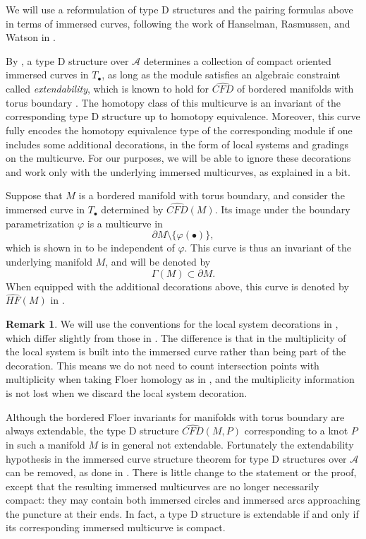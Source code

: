 \documentclass[11pt]{amsart}
\numberwithin{equation}{section}
\numberwithin{theorem}{section}
\theoremstyle{definition}
\newtheorem{remark}[theorem]{Remark}
\renewcommand{\phi}{\varphi}
\newcommand\HFhat{\widehat{\mathit{HF}}}
\newcommand{\CFD}{\widehat{\mathit{CFD}}}
\newcommand{\Alg}{\mathcal{A}}
\begin{document}
We will use a reformulation of type D structures and the pairing formulas above in terms of immersed curves, following the work of Hanselman, Rasmussen, and Watson in \cite{hrw,hrw-properties}. 

By \cite[Theorem 1.5]{hrw}, a type D structure over $\Alg$ determines a collection of compact oriented immersed curves in $T_\bullet$, as long as  the module  satisfies an algebraic constraint called \emph{extendability}, which is known to hold for $\CFD$ of bordered manifolds with torus boundary \cite[Theorem 1.4]{hrw}. The homotopy class of this multicurve is an invariant of the corresponding type D structure up to homotopy equivalence. Moreover, this curve fully encodes the homotopy equivalence type of the corresponding module if one includes some additional decorations, in the form of local systems and gradings on the multicurve. For our purposes, we will be able to ignore these decorations and work only with the underlying immersed multicurves, as explained in a bit.

Suppose that $M$ is a bordered manifold with torus boundary, and consider the immersed curve in $T_\bullet$ determined by $\CFD(M)$. Its image under the boundary parametrization $\phi$ is a multicurve in \[\partial M \setminus \{\phi(\bullet)\},\] which is shown in \cite{hrw} to be independent of $\phi$. This curve is thus an invariant of the underlying manifold $M$, and will be denoted by \[\Gamma(M)\subset \partial M.\]  When equipped with the additional decorations above, this curve is denoted by $\HFhat(M)$ in \cite{hrw}. 

\begin{remark}
We will use the conventions for the local system decorations  in \cite{Hanselman:CFK}, which differ slightly from those in \cite{hrw}. The difference is that in \cite{Hanselman:CFK} the multiplicity of the local system is built into the immersed curve rather than being part of the decoration. This means we do not need to count intersection points with multiplicity when taking Floer homology as in \cite{hrw}, and the multiplicity information is not lost when we discard the local system decoration.
\end{remark}

Although the bordered Floer invariants for manifolds with torus boundary are always extendable, the type D structure $\CFD(M,P)$ corresponding to a knot $P$ in such a manifold $M$ is in general not extendable. Fortunately the extendability hypothesis in the immersed curve structure theorem for type D structures over $\Alg$ can be removed, as  done in \cite[Theorems 5.14 and 5.27]{KWZ}. There is little change to the statement or the proof, except that the resulting immersed multicurves are no longer necessarily compact: they may contain both immersed circles and immersed arcs approaching the puncture at their ends. In fact, a type D structure is extendable if and only if its corresponding immersed multicurve is compact.
\end{document}
